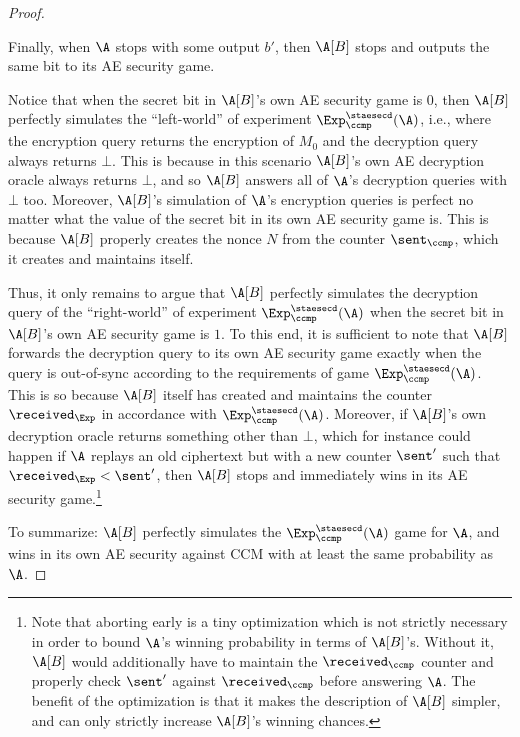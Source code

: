 \begin{proof}
\begin{itemize}
\end{itemize}

Finally,
when $\A$ stops with some output $b'$,
then $\A[B]$ stops and outputs the same bit to its AE security game.


Notice that when the secret bit in $\A[B]$'s own AE security game is $0$,
then $\A[B]$ perfectly simulates the ``left-world'' of experiment $\Exp_{\ccmp}^{\staesecd}(\A)$,
i.e., where the encryption query returns the encryption of $M_0$ and the decryption query always returns $\bot$.
This is because in this scenario $\A[B]$'s own AE decryption oracle always returns $\bot$,
and so $\A[B]$ answers all of $\A$'s decryption queries with $\bot$ too.
Moreover,
$\A[B]$'s simulation of $\A$'s encryption queries is perfect no matter what the value of the secret bit in its own AE security game is.
This is because $\A[B]$ properly creates the nonce $N$ from the counter $\sent_\ccmp$,
which it creates and maintains itself.


Thus,
it only remains to argue that $\A[B]$ perfectly simulates the decryption query of the ``right-world'' of experiment $\Exp_{\ccmp}^{\staesecd}(\A)$
when the secret bit in $\A[B]$'s own AE security game is $1$.
To this end,
it is sufficient to note that $\A[B]$ forwards the decryption query to its own AE security game exactly when the query is out-of-sync according to the requirements of game $\Exp_{\ccmp}^{\staesecd}(\A)$.
This is so because $\A[B]$ itself has created and maintains the counter $\received_\Exp$ in accordance with $\Exp_{\ccmp}^{\staesecd}(\A)$.
Moreover,
if $\A[B]$'s own decryption oracle returns something other than $\bot$,
which for instance could happen if $\A$ replays an old ciphertext but with a new counter $\sent'$ such that $\received_\Exp < \sent'$,
then $\A[B]$ stops and immediately wins in its AE security game.\footnote{Note
that aborting early is a tiny optimization which is not strictly necessary in order to bound $\A$'s winning probability in terms of $\A[B]$'s.
Without it,
$\A[B]$ would additionally have to maintain the $\received_\ccmp$ counter and properly check $\sent'$ against $\received_\ccmp$ before answering $\A$.
The benefit of the optimization is that it makes the description of $\A[B]$ simpler,
and can only strictly increase $\A[B]$'s winning chances. 
}

To summarize:
$\A[B]$ perfectly simulates the $\Exp_{\ccmp}^{\staesecd}(\A)$ game for $\A$,
and wins in its own AE security against CCM with at least the same probability as~$\A$.
\end{proof}

